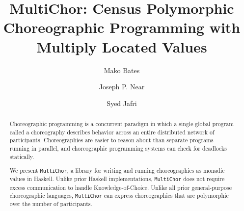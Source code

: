 \documentclass[sigplan,screen,review,anonymous]{acmart}
\newcommand{\MultiChor}{\texttt{Multi\-Chor}\xspace}
\begin{document}
\title[MultiChor]{MultiChor: Census Polymorphic Choreographic Programming with Multiply Located Values}


\author{Mako Bates}

\author{Joseph P. Near}
 
\author{Syed Jafri}

\renewcommand{\shortauthors}{Trovato et al.}

\begin{abstract}
  Choreographic programming is a concurrent paradigm
  in which a single global program called a choreography
  describes behavior across an entire distributed network of participants.
  Choreographies are easier to reason about than separate programs running in parallel,
  and choreographic programming systems can check for deadlocks statically.

  We present \MultiChor, a library for writing and running choreographies as
  monadic values in Haskell.
  Unlike prior Haskell implementations,
  \MultiChor does not require excess communication to handle Knowledge-of-Choice.
  Unlike all prior general-purpose choreographic languages,
  \MultiChor can express choreographies that are polymorphic over the number of participants.
\end{abstract}
\end{document}
